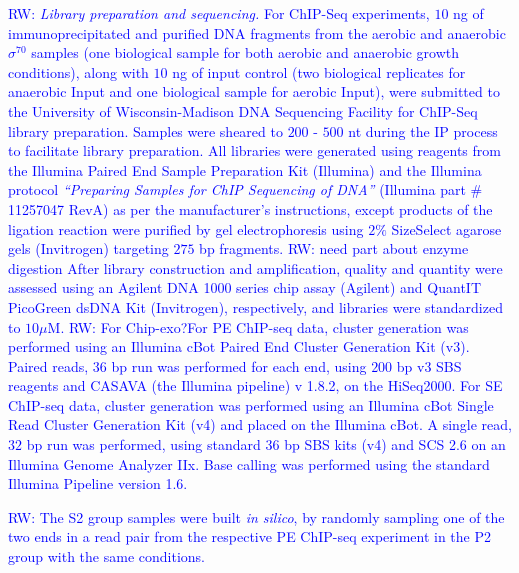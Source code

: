\documentclass{bmcart}
\newcommand{\SK}[1]{\textcolor{red}{SK: #1}}
\newcommand{\RW}[1]{\textcolor{blue}{RW: #1}}
\newcommand{\sig}{\sigma^{70}}
\begin{document}
\RW{ \textit{Library preparation and sequencing.} For ChIP-Seq
  experiments, $10$ ng of immunoprecipitated and purified DNA
  fragments from the aerobic and anaerobic $\sig$ samples (one
  biological sample for both aerobic and anaerobic growth conditions),
  along with $10$ ng of input control (two biological replicates for
  anaerobic Input and one biological sample for aerobic Input), were
  submitted to the University of Wisconsin-Madison DNA Sequencing
  Facility for ChIP-Seq library preparation. Samples were sheared to
  $200$ - $500$ nt during the IP process to facilitate library
  preparation. All libraries were generated using reagents from the
  Illumina Paired End Sample Preparation Kit (Illumina) and the
  Illumina protocol \textit{``Preparing Samples for ChIP Sequencing of
    DNA''} (Illumina part \# 11257047 RevA) as per the manufacturer's
  instructions, except products of the ligation reaction were purified
  by gel electrophoresis using $2\%$ SizeSelect agarose gels
  (Invitrogen) targeting $275$ bp fragments. \RW{need part about
    enzyme digestion} After library construction and amplification,
  quality and quantity were assessed using an Agilent DNA 1000 series
  chip assay (Agilent) and QuantIT PicoGreen dsDNA Kit (Invitrogen),
  respectively, and libraries were standardized to $10 \mu$M. \RW{For
    Chip-exo?}For PE ChIP-seq data, cluster generation was performed
  using an Illumina cBot Paired End Cluster Generation Kit
  (v3). Paired reads, $36$ bp run was performed for each end, using
  $200$ bp v3 SBS reagents and CASAVA (the Illumina pipeline) v 1.8.2,
  on the HiSeq2000. For SE ChIP-seq data, cluster generation was
  performed using an Illumina cBot Single Read Cluster Generation Kit
  (v4) and placed on the Illumina cBot. A single read, $32$ bp run was
  performed, using standard $36$ bp SBS kits (v4) and SCS 2.6 on an
  Illumina Genome Analyzer IIx. Base calling was performed using the
  standard Illumina Pipeline version 1.6.}

\RW{The S2 group samples were built \textit{in silico}, by randomly
  sampling one of the two ends in a read pair from the respective PE
  ChIP-seq experiment in the P2 group with the same conditions.}


\end{document}
